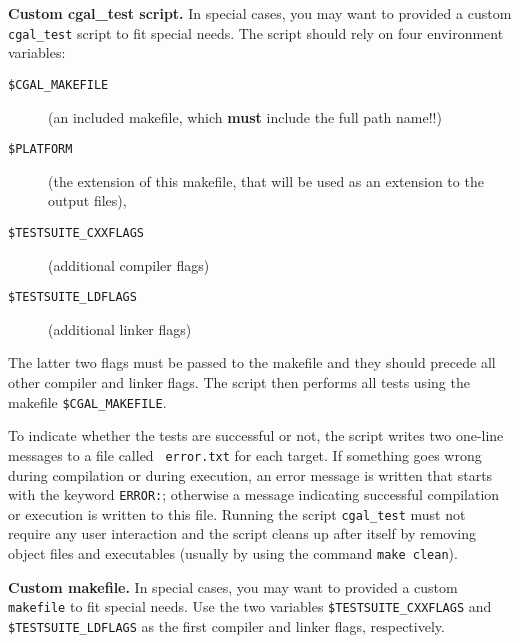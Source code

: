 \begin{ccAdvanced}
  \textbf{Custom cgal\_test script.} In special cases, you may want to
  provided a custom {\tt cgal\_test} script to fit special needs. The
  script should rely on four environment variables:
        \begin{description}
            \item[{\tt \$CGAL\_MAKEFILE}]%
                 (an included makefile, which {\bf must} include the full path
                  name!!) 
            \item[{\tt \$PLATFORM}]%
                 (the extension of this makefile, that will 
                 be used as an extension to the output files), 
            \item[{\tt \$TESTSUITE\_CXXFLAGS}]%
                 (additional compiler flags) 
            \item[{\tt \$TESTSUITE\_LDFLAGS}] 
                 (additional linker flags) 
        \end{description}
        The latter two flags must be passed to the makefile%
         and they should
        precede all other compiler and linker flags. The script then
        performs all tests using the makefile \verb|$CGAL_MAKEFILE|.
        
        To indicate whether the tests are successful or not, the
        script writes two one-line messages to a file called {\tt
          error.txt}  for each
        target. If something goes wrong during compilation or during
        execution, an error message is written that starts with the
        keyword {\tt ERROR:}; otherwise a message indicating
        successful compilation or execution is written to this file.
        Running the script {\tt cgal\_test} must not require any user
        interaction and the script cleans up after itself by removing
        object files and executables (usually by using the command
        {\tt make clean}).
        
        \textbf{Custom makefile.} In special cases, you may want to
        provided a custom {\tt makefile} to fit special needs. Use the
        two variables \verb|$TESTSUITE_CXXFLAGS|
         and \verb|$TESTSUITE_LDFLAGS|
         as the first compiler and linker flags,
        respectively.
\end{ccAdvanced}

